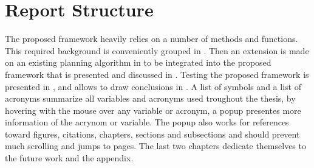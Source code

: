 \section{Report Structure}%
\label{sec:report_structure}
The proposed framework heavily relies on a number of methods and functions. This required background is conveniently grouped in . Then an extension is made on an existing planning algorithm in  to be integrated into the proposed framework that is presented and discussed in . Testing the proposed framework is presented in , and allows to draw conclusions in . A list of symbols and a list of acronyms summarize all variables and acronyms used troughout the thesis, by hovering with the mouse over any variable or acronym, a popup presentes more information of the acrynom or variable. The popup also works for references toward figures, citations, chapters, sections and subsections and should prevent much scrolling and jumps to pages. The last two chapters dedicate themselves to the future work and the appendix.\bs
